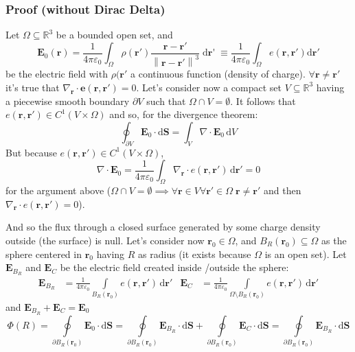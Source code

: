 \documentclass[a4paper, 12pt]{article}
\begin{document}
\subsubsection{Proof  (without Dirac Delta)}
Let \(\Omega \subseteq \mathbb{R}^3\) be a bounded open set, and
\[
    \mathbf{E}_{0}(\mathbf{r}) = 
    \frac{1}{4\pi \varepsilon_{0}}
    \int_{\Omega} \rho(\mathbf{r}')
    \frac{\mathbf{r} - \mathbf{r}'}{\left\|\mathbf {r} - \mathbf {r}'\right\|^{3}}
    \mathop{\mathrm{d}\mathbf{r}'}
    \equiv \frac{1}{4\pi \varepsilon _{0}}
    \int_{\Omega} e(\mathbf {r,\mathbf {r} '}){\mathrm {d} \mathbf {r}'}
\]
be the electric field with \(\rho(\mathbf{r}'\) a continuous function (density of charge).
\(\forall\mathbf{r} \neq \mathbf{r}'\) it's true that \(\nabla_\mathbf{r}  \cdot \mathbf{e} (\mathbf{r,r'} ) = 0\). 
Let's consider now a compact set \(V \subseteq \mathbb{R}^3\) having a piecewise smooth boundary \(\partial V\) such that \(\Omega \cap V = \emptyset\). It follows that \(e(\mathbf{r},\mathbf{r}') \in C^1(V \times \Omega)\) and so, for the divergence theorem:
\[
    \oint_{\partial V} \mathbf{E}_0 \cdot \mathrm{d}\mathbf{S} = \int_V \nabla \cdot \mathbf{E}_0 \, \mathrm{d}V
\]
But because \(e(\mathbf{r},\mathbf{r}') \in C^1(V \times \Omega)\),
\[
    \nabla \cdot \mathbf{E}_0 = 
    \frac{1}{4\pi\varepsilon_0}
    \int_\Omega \nabla_\mathbf{r} \cdot e(\mathbf{r}, \mathbf{r}')\, \mathrm{d}\mathbf{r}' = 0
\]
for the argument above (\(\Omega \cap V = \emptyset \implies \forall \mathbf{r} \in V \forall \mathbf{r}' \in \Omega \; \mathbf{r} \neq \mathbf{r}'\) and then \(\nabla_\mathbf{r} \cdot e(\mathbf{r}, \mathbf{r}') = 0\)).

And so the flux through a closed surface generated by some charge density outside (the surface) is null. 
Let's consider now \(\mathbf{r}_0 \in \Omega\), and \(B_R(\mathbf{r}_0) \subseteq \Omega\) as the sphere centered in \(\mathbf{r}_0\) having \(R\) as radius (it exists because \(\Omega\) is an open set).
Let \(\mathbf{E}_{B_R}\) and \(\mathbf{E}_C\) be the electric field created inside \slash outside the sphere:
\begin{align*}
    \mathbf{E}_{B_R} &= 
    \frac{1}{4\pi\varepsilon_0}
    \int\limits_{B_R(\mathbf{r}_0)}
        e(\mathbf{r},\mathbf{r}') \, \mathrm{d}\mathbf{r}'
    &
    \mathbf{E}_C &=
    \frac{1}{4\pi\varepsilon_0}
    \int\limits_{\Omega \setminus B_R(\mathbf{r}_0)}
        e(\mathbf{r},\mathbf{r}') \, \mathrm{d}\mathbf{r}'
\end{align*}
and
\(\mathbf{E}_{B_R} + \mathbf{E}_C = \mathbf{E}_0\)
\[
    \Phi(R) = \oint\limits_{\partial B_R(\mathbf{r}_0)}
        \mathbf{E}_0 \cdot \mathrm{d}\mathbf{S}
    = \oint\limits_{\partial B_R(\mathbf{r}_0)}
        \mathbf{E}_{B_R}
        \cdot \mathrm{d}\mathbf{S}
    + \oint\limits_{\partial B_R(\mathbf{r}_0)}
        \mathbf{E}_C
        \cdot \mathrm{d}\mathbf{S}
    = \oint\limits_{\partial B_R(\mathbf{r}_0)}
        \mathbf{E}_{B_R}
        \cdot \mathrm{d}\mathbf{S}
\]
\end{document}
